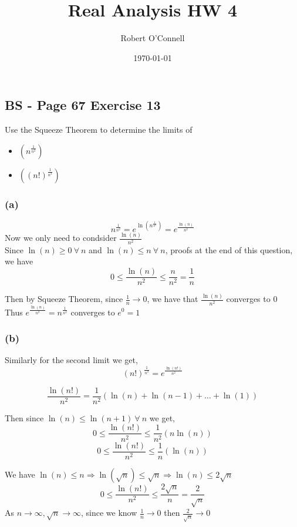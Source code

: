 \documentclass{article}
\title{\textbf{Real Analysis HW 4}}
\author{Robert O'Connell}
\date{\today}
\begin{document}
\maketitle
\vspace{5mm}

\subsection*{BS - Page 67 Exercise 13}
Use the Squeeze Theorem to determine the limits of 
\begin{itemize}
    \item \(\left(n^{\frac{1}{n^2}}\right)\)
    \item \(\left( (n!)^{\frac{1}{n^2}}\right)\)
\end{itemize}

\subsubsection*{(a)}
\[
n^{\frac{1}{n^2}} = e^{\ln(n^{\frac{1}{n^2}})} = e^{\frac{\ln(n)}{n^2}}
\]
Now we only need to condsider \(\frac{\ln(n)}{n^2}\)
\\

Since \(\ln(n) \geq 0 \ \forall \ n\) and \(\ln(n) \leq n \ \forall \ n\), proofs at the end of this question, we have
\[
0 \leq \frac{\ln(n)}{n^2} \leq \frac{n}{n^2} = \frac{1}{n}
\]

Then by Squeeze Theorem, since \(\frac{1}{n} \rightarrow 0\), we have that \(\frac{\ln(n)}{n^2}\) converges to \(0\)
\\

Thus \(e^{\frac{\ln(n)}{n^2}} = n^{\frac{1}{n^2}}\) converges to \(e^0 = 1\)
\\

\subsubsection*{(b)}

Similarly for the second limit we get,
\[
(n!)^\frac{1}{n^2} = e^{\frac{\ln(n!)}{n^2}}
\]

\[
\frac{\ln(n!)}{n^2} = \frac{1}{n^2} (\ln(n) + \ln(n-1) + \dots + \ln(1))
\]

Then since \(\ln(n) \leq \ln(n+1) \ \forall \ n\) we get,
\[
0 \leq \frac{\ln(n!)}{n^2} \leq \frac{1}{n^2}(n\ln(n))
\]
\[
0 \leq \frac{\ln(n!)}{n^2} \leq \frac{1}{n}(\ln(n)) 
\]

We have \(\ln(n) \leq n \Rightarrow \ln(\sqrt{n}) \leq \sqrt{n} \Rightarrow \ln(n) \leq 2\sqrt{n}\)
\[
0 \leq \frac{\ln(n!)}{n^2} \leq \frac{2\sqrt{n}}{n} = \frac{2}{\sqrt{n}}
\]
As \(n \rightarrow \infty, \sqrt{n} \rightarrow \infty\), since we know \(\frac{1}{n} \rightarrow 0\) 
then \(\frac{2}{\sqrt{n}} \rightarrow 0\)
\end{document}
